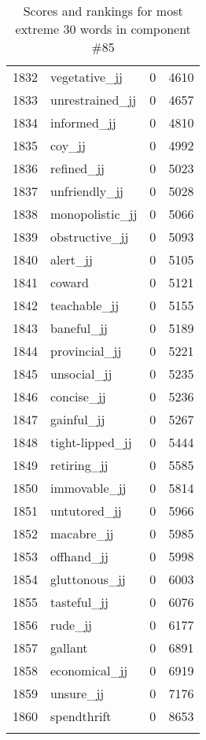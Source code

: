 \begin{longtable}[!htbp]{| rlr@{.}l |}
    1832 & vegetative\_jj & 0 & 4610 \\
    1833 & unrestrained\_jj & 0 & 4657 \\
    1834 & informed\_jj & 0 & 4810 \\
    1835 & coy\_jj & 0 & 4992 \\
    1836 & refined\_jj & 0 & 5023 \\
    1837 & unfriendly\_jj & 0 & 5028 \\
    1838 & monopolistic\_jj & 0 & 5066 \\
    1839 & obstructive\_jj & 0 & 5093 \\
    1840 & alert\_jj & 0 & 5105 \\
    1841 & coward & 0 & 5121 \\
    1842 & teachable\_jj & 0 & 5155 \\
    1843 & baneful\_jj & 0 & 5189 \\
    1844 & provincial\_jj & 0 & 5221 \\
    1845 & unsocial\_jj & 0 & 5235 \\
    1846 & concise\_jj & 0 & 5236 \\
    1847 & gainful\_jj & 0 & 5267 \\
    1848 & tight-lipped\_jj & 0 & 5444 \\
    1849 & retiring\_jj & 0 & 5585 \\
    1850 & immovable\_jj & 0 & 5814 \\
    1851 & untutored\_jj & 0 & 5966 \\
    1852 & macabre\_jj & 0 & 5985 \\
    1853 & offhand\_jj & 0 & 5998 \\
    1854 & gluttonous\_jj & 0 & 6003 \\
    1855 & tasteful\_jj & 0 & 6076 \\
    1856 & rude\_jj & 0 & 6177 \\
    1857 & gallant & 0 & 6891 \\
    1858 & economical\_jj & 0 & 6919 \\
    1859 & unsure\_jj & 0 & 7176 \\
    1860 & spendthrift & 0 & 8653 \\
    \hline
    \caption{Scores and rankings for most extreme 30 words in component \#85} \\
\end{longtable}
